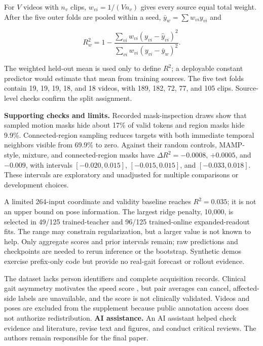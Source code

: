 \documentclass{article}
\begin{document}
For \(V\) videos with \(n_v\) clips, \(w_{vi}=1/(Vn_v)\) gives every
source equal total weight. After the five outer folds are pooled within
a seed, \(\bar y_w=\sum w_{vi}y_{vi}\) and

\[R_w^2=1-\frac{\sum_{vi}w_{vi}(y_{vi}-\hat y_{vi})^2}{\sum_{vi}w_{vi}(y_{vi}-\bar y_w)^2}.\]

The weighted held-out mean is used only to define \(R^2\); a deployable
constant predictor would estimate that mean from training sources. The
five test folds contain 19, 19, 19, 18, and 18 videos, with 189, 182,
72, 77, and 105 clips. Source-level checks confirm the split assignment.

\textbf{Supporting checks and limits.} Recorded mask-inspection draws
show that sampled motion masks hide about 17\% of valid tokens and
region masks hide 9.9\%. Connected-region sampling reduces targets with
both immediate temporal neighbors visible from 69.9\% to zero. Against
their random controls, MAMP-style, mixture, and connected-region masks
have \(\Delta R^2=-0.0008\), \(+0.0005\), and \(-0.009\), with intervals
\([-0.020,0.015]\), \([-0.015,0.015]\), and \([-0.033,0.018]\). These
intervals are exploratory and unadjusted for multiple comparisons or
development choices.

A limited 264-input coordinate and validity baseline reaches
\(R^2=0.035\); it is not an upper bound on pose information. The largest
ridge penalty, 10,000, is selected in 49/125 trained-teacher and 96/125
trained-online expanded-readout fits. The range may constrain
regularization, but a larger value is not known to help. Only aggregate
scores and prior intervals remain; raw predictions and checkpoints are
needed to rerun inference or the bootstrap. Synthetic demos exercise
prefix-only code but provide no real-gait forecast or rollout evidence.

The dataset lacks person identifiers and complete acquisition records.
Clinical gait asymmetry motivates the speed score \citep{stroke}, but
pair averages can cancel, affected-side labels are unavailable, and the
score is not clinically validated. Videos and poses are excluded from
the supplement because public annotation access does not authorize
redistribution. \textbf{AI assistance.} An AI assistant helped check
evidence and literature, revise text and figures, and conduct critical
reviews. The authors remain responsible for the final paper.
\end{document}
